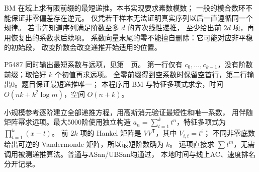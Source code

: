 BM 在域上求有限前缀的最短递推。本书实现要求素数模数；
一般的模合数环不能保证非零偏差存在逆元。
仅凭若干样本无法证明真实序列以后一直遵循同一个规律。
若事先知道序列满足阶数至多 $d$ 的齐次线性递推，
至少给出前 $2d$ 项，再用恢复出的系数求后续项。
系数向量末尾的零不能擅自删除：它可能对应非平稳的初始段，
改变阶数会改变递推开始适用的位置。

P5487 同时输出最短系数与远项，见第~\pageref{usage-example-160}~页。
第一行仅有 $c_0,\ldots,c_{k-1}$，没有阶数前缀；取恰好 $k$ 个初值再求远项。
全零前缀得到空系数时保留空首行，第二行输出0。题目保证最短递推唯一；
本程序用 BM 与特征多项式求余，时间 $O(nk+k^2\log m)$，空间 $O(n+k)$。

小规模参考逐阶建立全部递推方程，用高斯消元验证最短性和唯一系数，
用伴随矩阵幂求远项。最大5000阶使用独立构造
$a_n=\sum_{t=1}^{k}t^n$，特征多项式为 $\prod_{t=1}^{k}(x-t)$。
前 $2k$ 项的 Hankel 矩阵是 $VV^{\mathsf T}$，其中 $V_{i,t}=t^i$；
不同非零底数给出可逆的 Vandermonde 矩阵，所以最短阶数确为 $k$。
远项直接求 $\sum t^m$，无需调用被测递推算法。普通与ASan/UBSan均通过，
本地时间与线上AC、速度排名分开记录。


